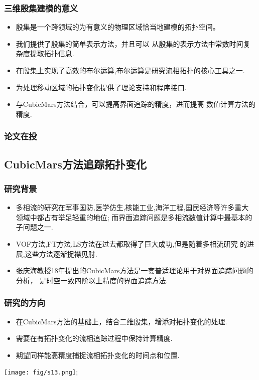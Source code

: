 \documentclass[UTF8]{ctexbeamer}	%
\theoremstyle{plain}
\theoremstyle{definition}
\theoremstyle{remark}
\numberwithin{equation}{section}
\begin{document}
\begin{frame}
    \frametitle{三维殷集建模的意义}
    \begin{itemize}
        \item 殷集是一个跨领域的为有意义的物理区域恰当地建模的拓扑空间。
        \item 我们提供了殷集的简单表示方法，并且可以
        从殷集的表示方法中常数时间复杂度提取拓扑信息.
        \item 在殷集上实现了高效的布尔运算,布尔运算是研究流相拓扑的核心工具之一.
        \item 为处理移动区域的拓扑变化提供了理论支持和程序接口.
        \item 与CubicMars方法结合，可以提高界面追踪的精度，进而提高
        数值计算方法的精度.
        \end{itemize}
\end{frame}

\begin{frame}
    \frametitle{论文在投}
\end{frame}

\subsection{CubicMars方法追踪拓扑变化}
\begin{frame}
    \frametitle{研究背景}
    \begin{itemize}
        \item 多相流的研究在军事国防,医学仿生,核能工业,海洋工程,国民经济等许多重大
        领域中都占有举足轻重的地位; 而界面追踪问题是多相流数值计算中最基本的子问题之一.
        \item VOF方法,FT方法,LS方法在过去都取得了巨大成功,但是随着多相流研究
        的进展,这些方法逐渐捉襟见肘.
        \item 张庆海教授18年提出的CubicMars方法是一套普适理论用于对界面追踪问题的分析，
        是时空一致四阶以上精度的界面追踪方法.
    \end{itemize}
    
\end{frame}

\begin{frame}
    \frametitle{研究的方向} 
    \begin{itemize}
        \item 在CubicMars方法的基础上，结合二维殷集，增添对拓扑变化的处理.
        \item 需要在有拓扑变化的流相追踪过程中保持计算精度.
        \item 期望同样能高精度捕捉流相拓扑变化的时间点和位置.
    \end{itemize}
    \centering
    \texttt{[image: fig/s13.png]};
\end{frame}
\end{document}
